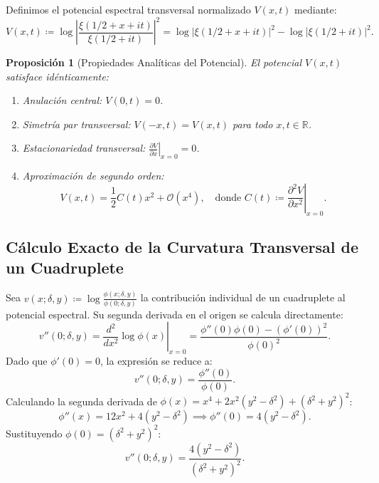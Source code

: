 \documentclass[11pt,a4paper]{article}
\newtheorem{proposition}[theorem]{Proposición}
\theoremstyle{definition}
\theoremstyle{remark}
\begin{document}
Definimos el potencial espectral transversal normalizado $V(x, t)$ mediante:
\begin{equation}
V(x, t) \coloneqq \log \left| \frac{\xi(1/2 + x + it)}{\xi(1/2 + it)} \right|^2 = \log |\xi(1/2 + x + it)|^2 - \log |\xi(1/2 + it)|^2.
\end{equation}

\begin{proposition}[Propiedades Analíticas del Potencial]
El potencial $V(x, t)$ satisface idénticamente:
\begin{enumerate}
    \item Anulación central: $V(0, t) = 0$.
    \item Simetría par transversal: $V(-x, t) = V(x, t)$ para todo $x, t \in \mathbb{R}$.
    \item Estacionariedad transversal: $\left. \frac{\partial V}{\partial x} \right|_{x=0} = 0$.
    \item Aproximación de segundo orden:
    \begin{equation}
    V(x, t) = \frac{1}{2} C(t) x^2 + \mathcal{O}(x^4), \quad \text{donde } C(t) \coloneqq \left. \frac{\partial^2 V}{\partial x^2} \right|_{x=0}.
    \end{equation}
\end{enumerate}
\end{proposition}

\subsection{Cálculo Exacto de la Curvatura Transversal de un Cuadruplete}

Sea $v(x; \delta, y) \coloneqq \log \frac{\phi(x; \delta, y)}{\phi(0; \delta, y)}$ la contribución individual de un cuadruplete al potencial espectral. Su segunda derivada en el origen se calcula directamente:
\begin{equation}
v''(0; \delta, y) = \left. \frac{d^2}{dx^2} \log \phi(x) \right|_{x=0} = \frac{\phi''(0)\phi(0) - (\phi'(0))^2}{\phi(0)^2}.
\end{equation}
Dado que $\phi'(0) = 0$, la expresión se reduce a:
\begin{equation}
v''(0; \delta, y) = \frac{\phi''(0)}{\phi(0)}.
\end{equation}
Calculando la segunda derivada de $\phi(x) = x^4 + 2x^2(y^2 - \delta^2) + (\delta^2 + y^2)^2$:
\begin{equation}
\phi''(x) = 12x^2 + 4(y^2 - \delta^2) \implies \phi''(0) = 4(y^2 - \delta^2).
\end{equation}
Sustituyendo $\phi(0) = (\delta^2 + y^2)^2$:
\begin{equation}
v''(0; \delta, y) = \frac{4(y^2 - \delta^2)}{(\delta^2 + y^2)^2}.
\end{equation}
\end{document}
